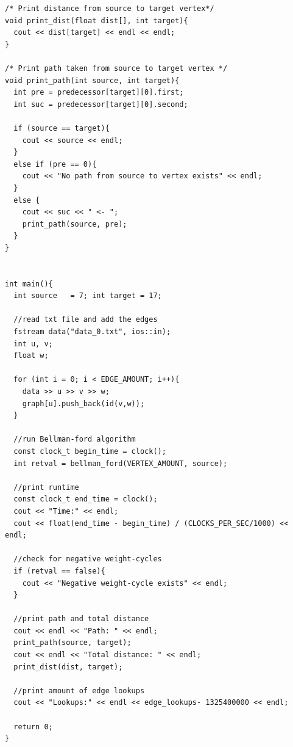 \documentclass[11pt]{article}
\begin{document}
\begin{lstlisting}
/* Print distance from source to target vertex*/
void print_dist(float dist[], int target){
  cout << dist[target] << endl << endl;
}

/* Print path taken from source to target vertex */
void print_path(int source, int target){
  int pre = predecessor[target][0].first;
  int suc = predecessor[target][0].second;

  if (source == target){
    cout << source << endl;
  }
  else if (pre == 0){
    cout << "No path from source to vertex exists" << endl;
  }
  else {
    cout << suc << " <- ";
    print_path(source, pre);
  }
}


int main(){
  int source   = 7; int target = 17;

  //read txt file and add the edges
  fstream data("data_0.txt", ios::in);
  int u, v;
  float w;

  for (int i = 0; i < EDGE_AMOUNT; i++){
    data >> u >> v >> w;
    graph[u].push_back(id(v,w));
  }

  //run Bellman-ford algorithm
  const clock_t begin_time = clock();
  int retval = bellman_ford(VERTEX_AMOUNT, source);

  //print runtime
  const clock_t end_time = clock();
  cout << "Time:" << endl;
  cout << float(end_time - begin_time) / (CLOCKS_PER_SEC/1000) << endl;

  //check for negative weight-cycles
  if (retval == false){
    cout << "Negative weight-cycle exists" << endl;
  }

  //print path and total distance
  cout << endl << "Path: " << endl;
  print_path(source, target);
  cout << endl << "Total distance: " << endl;
  print_dist(dist, target);

  //print amount of edge lookups
  cout << "Lookups:" << endl << edge_lookups- 1325400000 << endl;

  return 0;
}
\end{lstlisting}
\ \\
\end{document}
